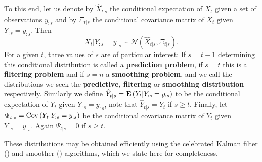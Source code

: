 To this end, let us denote by $\hat X_{t | s}$ the conditional expectation of $X_{t}$ given a set of observations $y_{:s}$ and by $\Xi_{t | s}$ the conditional covariance matrix of $X_{t}$ given $Y_{:s} = y_{:s}$. Then $$X_{t} | Y_{:s} = y_{:s} \sim \mathcal N \left( \hat X_{t|s}, \Xi_{t|s} \right).$$ For a given $t$, three values of $s$ are of particular interest: If $s = t - 1$ determining this conditional distribution is called a \textbf{prediction problem}, if $s = t$ this is a \textbf{filtering problem} and if $s = n$ a \textbf{smoothing problem}, and we call the distributions we seek the \textbf{predictive, filtering} or \textbf{smoothing distribution} respectively. 
Similarly we define $\hat Y_{t|s} = \mathbf E \left( Y_{t} \middle| Y_{:s} = y_{:s} \right)$ to be the conditional expectation of $Y_{t}$ given $Y_{:s}=y_{:s}$, note that $\hat Y_{t|s} = Y_{t}$ if $s \geq t$. Finally, let $\Psi_{t|s} = \text{Cov} \left( Y_{t} | Y_{:s} = y_{:s} \right)$ be the conditional covariance matrix of $Y_{t}$ given $Y_{:s} = y_{:s}$. Again $\Psi_{t|s} = 0$ if $s \geq t$. 

These distributions may be obtained efficiently using the celebrated Kalman filter () and smoother () algorithms, which we state here for completeness.

